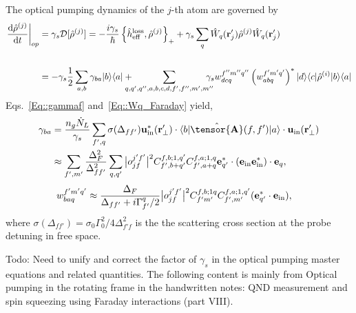 \documentclass[pra,twocolumn,floatfix,superscriptaddress]{revtex4-1} %
\newcommand{\dt}[1]{\frac{{\mathrm d} {#1}}{{\mathrm d}t}}
\def\br{\mathbf{r}}
\def\bra#1{\langle{#1}\rvert}%
\def\ket#1{\lvert{#1}\rangle}%
\newcommand{\mbf}[1]{\mathbf{#1}}
\newcommand{\inp}{{\rm in}}
\newcommand{\comment}[1]{{\color{Maroon} #1}}
\begin{document}
\begin{appendix}
The optical pumping dynamics of the $ j $-th atom are governed by 
\begin{align}
\left.\dt{\hat{\rho}^{(j)}}\right|_{op} &= \gamma_s\mathcal{D}[\hat{\rho}^{(j)}]=-\frac{i\gamma_s}{\hbar}\left\{\hat{h}^{\rm loss}_{\rm eff},\hat{\rho}^{(j)} \right\}_+ + \gamma_s\sum_{q}\hat{W}_q(\br'_j)\hat{\rho}^{(j)}\hat{W}_q(\br'_j)\\
\\
&=-\gamma_s\frac{1}{2}\sum_{a,b}\gamma_{ba}\ket{b}\bra{a}+
\!\!\!\!\!\!\sum_{q,q',q'',a,b,c,d,f',f'',m',m''}\!\!\!\!\!\! \gamma_sw_{dcq}^{f''m''q''}\left(w_{abq}^{f'm'q'}\right)^*\ket{d}\bra{c}\hat{\rho}^{(i)}\ket{b}\bra{a}
\end{align}
Eqs.~\eqref{Eq::gammaf} and~\eqref{Eq::Wq_Faraday} yield,
\begin{subequations}
	\begin{align}
		\gamma_{ba} 
		&=\frac{n_g\dot{N}_L}{\gamma_s}  \sum_{f',q} \sigma (\Delta_{ff'} ) \mathbf{u}^*_\inp(\br'_\perp)\cdot \bra{b} \hat{\tensor{\mbf{A}}}(f,f') \ket{a}  \cdot \mathbf{u}_\inp(\br'_\perp)\\
		&\approx  \sum_{f',m'} \frac{\Delta_{F}^2}{\Delta_{ff'}^2}\sum_{q,q'} \big| o_{jf}^{j'f'} \big|^2C_{f',b+q'}^{f,b;1, q'}C_{f',a+q}^{f,a;1, q} \mathbf{e}_{q'}^* \cdot (\mathbf{e}_{\rm in}\mathbf{e}_{\rm in}^* )\cdot \mathbf{e}_q,
	\end{align}
\end{subequations}
	\begin{align}
		w_{baq}^{f'm'q'}
		&\approx  \frac{\Delta_{F}}{\Delta_{ff'}+i\Gamma_{f'}^q/2} \big| o_{jf}^{j'f'}  \big|^2 C_{f'm'}^{f,b;1 q}C_{f',m'}^{f,a;1,q'} (\mathbf{e}_{q'}^* \cdot \mathbf{e}_{\rm in}),
	\end{align}
where $ \sigma (\Delta_{ff'} )  = \sigma_0 \Gamma_0^2/4\Delta^2_{f' f}$ is the the scattering cross section at the probe detuning in free space. 

\comment{Todo: Need to unify and correct the factor of $\gamma_s$ in the optical pumping master equations and related quantities. The following content is mainly from Optical pumping in the rotating frame in the handwritten notes: QND measurement and spin squeezing using Faraday interactions (part VIII).}


\end{appendix}
\end{document}
